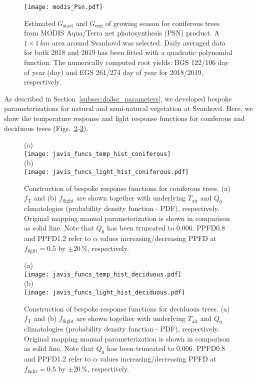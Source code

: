 \documentclass[bg, manuscript]{copernicus}
\begin{document}
\begin{figure}[th]
  \texttt{[image: modis\_Psn.pdf]}
  \caption{Estimated $G_\mathrm{start}$ and $G_\mathrm{end}$ of growing season for coniferous trees from MODIS Aqua/Terra net photosynthesis (PSN) product. A $1\times 1\,\unit{km}$ area around Svanhovd was selected. Daily averaged data for both 2018 and 2019 has been fitted with a quadratic polynomial function. The numerically computed root yields: BGS 122/106 day of year (\unit{doy}) and EGS 261/274 day of year for 2018/2019, respectively.}
  \label{fig:modis_Psn}
\end{figure}

As described in Section~\ref{subsec:do3se_parameters}, we developed bespoke parameterizations for natural and semi-natural vegetation at Svanhovd. Here, we show the temperature response and light response functions for coniferous and deciduous trees (Figs.~\ref{fig:f_temp_spruce}-\ref{fig:f_temp_birch}). 

\begin{figure}[t]
  \centering
  (a)\\
  \texttt{[image: javis\_funcs\_temp\_hist\_coniferous]}\\
  (b)\\
  \texttt{[image: javis\_funcs\_light\_hist\_coniferous.pdf]}
\caption{Construction of bespoke response functions for coniferous trees. (a) $f_\mathrm{T}$ and (b) $f_\mathrm{flight}$ are shown together with underlying $T_\mathrm{air}$ and $Q_0$ climatologies (probability density function - PDF), respectively. Original mapping manual parameterization is shown in comparison as solid line. Note that $Q_0$ has been truncated to $0.006$. PPFD0.8 and PPFD1.2 refer to $\alpha$ values increasing/decreasing PPFD at $f_\mathrm{light}=0.5$ by $\pm 20\,\%$, respectively.}
\label{fig:f_temp_spruce}
\end{figure}

\begin{figure}[t]
  \centering
  (a)\\
  \texttt{[image: javis\_funcs\_temp\_hist\_deciduous.pdf]}\\
  (b)\\
  \texttt{[image: javis\_funcs\_light\_hist\_deciduous.pdf]}
\caption{Construction of bespoke response functions for deciduous trees. (a) $f_\mathrm{T}$ and (b) $f_\mathrm{flight}$ are shown together with underlying $T_\mathrm{air}$ and $Q_0$ climatologies (probability density function - PDF), respectively. Original mapping manual parameterization is shown in comparison as solid line. Note that $Q_0$ has been truncated to $0.006$. PPFD0.8 and PPFD1.2 refer to $\alpha$ values increasing/decreasing PPFD at $f_\mathrm{light}=0.5$ by $\pm 20\,\%$, respectively.}
\label{fig:f_temp_birch}
\end{figure}
\end{document}
